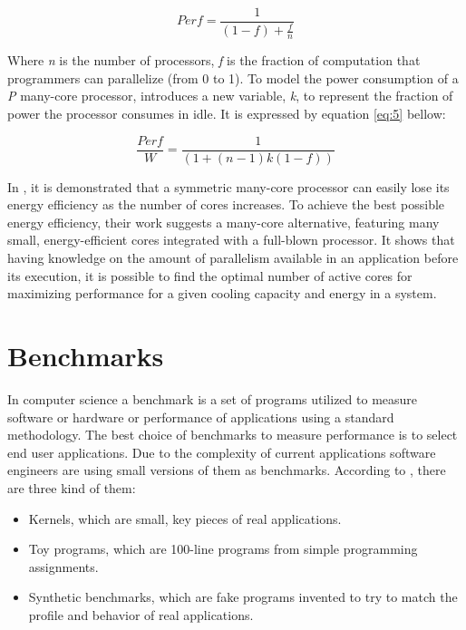 \begin{equation}\label{eq:4}
Perf = \frac{1}{(1 - f) + \frac{f}{n}}
\end{equation}

Where \textit{n} is the number of processors,  \textit{f} is the fraction of
computation that programmers can parallelize  (from 0 to 1). To model the
power consumption of a \textit{P} many-core processor, \cite{Dong} introduces a
new variable, \textit{k}, to represent the fraction of power the processor
consumes in idle. It is expressed by equation \ref{eq:5} bellow:

\begin{equation}\label{eq:5}
\frac{Perf}{W} = \frac{1}{(1 + (n -1 ) k (1 - f))}
\end{equation}

In \cite{Dong}, it is demonstrated that a symmetric many-core
processor can easily  lose its energy efficiency as the number of cores
increases. To achieve the  best possible energy efficiency, their work
suggests a many-core alternative, featuring many small, energy-efficient cores
integrated with a full-blown processor. It shows that having knowledge on the
amount of parallelism available in an application before its execution, it is
possible to  find the optimal number of active cores for maximizing performance
for a given cooling capacity and energy in a system.

\section{Benchmarks}

In computer science a benchmark is a set of programs utilized to measure
software or hardware or performance of applications using a standard
methodology. The best choice of benchmarks to measure performance is to select
end user applications. Due to the complexity of current applications software
engineers are using small versions of them as benchmarks. According to
\cite{Hennessy}, there are three kind of them: 

\begin{itemize}
\item Kernels, which are small, key pieces of real applications.
\item Toy programs, which are 100-line programs from simple programming
assignments.
\item Synthetic benchmarks, which are fake programs invented to try to match the
profile and behavior of real applications.
\end{itemize}

